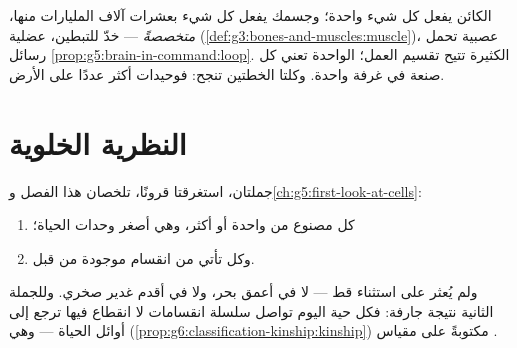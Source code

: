 \begin{remark}\label{rem:g6:cell-unit-of-life:twoways}
الكائن  يفعل كل شيء  واحدة؛ وجسمك يفعل كل شيء
بعشرات آلاف المليارات منها، \emph{متخصصةً} ---  خدّ للتبطين،
 عضلية  (\cref{def:g3:bones-and-muscles:muscle})،
 عصبية تحمل رسائل
\cref{prop:g5:brain-in-command:loop}.  الكثيرة تتيح تقسيم
العمل؛  الواحدة تعني كل صنعة في غرفة واحدة. وكلتا الخطتين
تنجح: فوحيدات  أكثر  عددًا على الأرض.
\end{remark}

\section{النظرية الخلوية}

\begin{proposition}\label{prop:g6:cell-unit-of-life:theory}
جملتان، استغرقتا قرونًا، تلخصان هذا الفصل
و\cref{ch:g5:first-look-at-cells}:
\begin{enumerate}
  \item كل  مصنوع من  واحدة أو أكثر، وهي أصغر وحدات
        الحياة؛
  \item وكل  تأتي من انقسام  موجودة من قبل.
\end{enumerate}
ولم يُعثر على استثناء قط --- لا في أعمق بحر، ولا في أقدم غدير
صخري. وللجملة الثانية نتيجة جارفة: فكل  حية اليوم تواصل سلسلة
انقسامات لا انقطاع فيها ترجع إلى أوائل الحياة --- وهي 
(\cref{prop:g6:classification-kinship:kinship}) مكتوبةً على مقياس
.
\end{proposition}
\admitted

